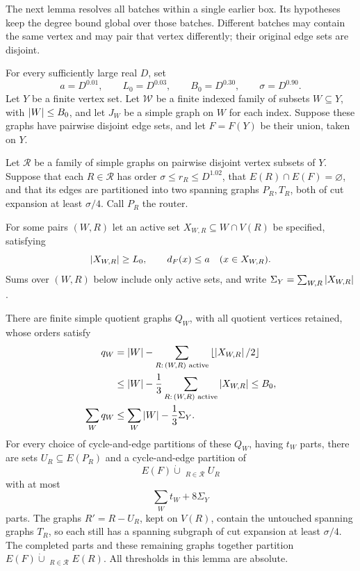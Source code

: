 The next lemma resolves all batches within a single earlier box.  Its
hypotheses keep the degree bound global over those batches.  Different
batches may contain the same vertex and may pair that vertex differently;
their original edge sets are disjoint.

\begin{lemma}\label{lem:batch-resolution}
For every sufficiently large real $D$, set
\[
 a=D^{0.01},\qquad L_0=D^{0.03},\qquad
 B_0=D^{0.30},\qquad \sigma=D^{0.90}.
\]
Let $Y$ be a finite vertex set.  Let $\mathcal W$ be a finite indexed
family of subsets $W\subseteq Y$, with $\left|W\right|\le B_0$, and let $J_W$
be a simple graph on $W$ for each index.  Suppose these graphs have
pairwise disjoint edge sets, and let $F=F(Y)$ be their union, taken on
$Y$.

Let $\mathcal R$ be a family of simple graphs on pairwise disjoint vertex
subsets of $Y$.  Suppose that each $R\in\mathcal R$ has order
$\sigma\le r_R\le D^{1.02}$, that
$E(R)\cap E(F)=\varnothing$, and that its edges are partitioned into
two spanning graphs $P_R,T_R$, both of cut expansion at least
$\sigma/4$.  Call $P_R$ the router.

For some pairs $(W,R)$ let an active set
$X_{W,R}\subseteq W\cap V(R)$ be specified, satisfying
\begin{equation}\label{eq:batch-active-hypotheses}
 \left|X_{W,R}\right|\ge L_0,
 \qquad d_F(x)\le a\quad(x\in X_{W,R}).
\end{equation}
Sums over $(W,R)$ below include only active sets, and write
$\Sigma_Y=\sum_{W,R}\left|X_{W,R}\right|$.

There are finite simple quotient graphs $Q_W$, with all quotient vertices
retained, whose orders satisfy
\begin{align}
 q_W&=\left|W\right|-\sum_{R:\,(W,R)\text{ active}}
                 \left\lfloor\left|X_{W,R}\right|/2\right\rfloor\notag\\
 &\le\left|W\right|-\frac13
            \sum_{R:\,(W,R)\text{ active}}\left|X_{W,R}\right|
 \le B_0,\label{eq:batch-quotient-order}\\
 \sum_W q_W&\le\sum_W\left|W\right|-\frac13\Sigma_Y.
 \label{eq:batch-total-order}
\end{align}
For every choice of cycle-and-edge partitions of these $Q_W$, having
$t_W$ parts, there are sets $U_R\subseteq E(P_R)$ and a cycle-and-edge
partition of
\[
 E(F)\mathbin{\dot\cup}\mathop{\dot\bigcup}_{R\in\mathcal R}U_R
\]
with at most
\begin{equation}\label{eq:batch-parts}
 \sum_W t_W+8\Sigma_Y
\end{equation}
parts.  The graphs $R'=R-U_R$, kept on $V(R)$, contain the untouched
spanning graphs $T_R$, so each still has a spanning subgraph of cut
expansion at least $\sigma/4$.  The completed parts and these remaining
graphs together partition
$E(F)\mathbin{\dot\cup}\mathop{\dot\bigcup}_{R\in\mathcal R}E(R)$.
All thresholds in this lemma are absolute.
\end{lemma}

